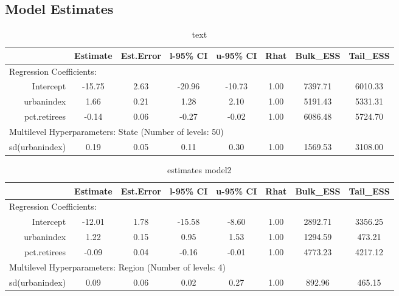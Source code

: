 \documentclass[12pt]{article}
\begin{document}
\FloatBarrier


\subsection*{Model Estimates}

\begin{table}[ht]
	\centering
	 \begin{adjustbox}{max width=\textwidth}
	\begin{tabular}{rccccccc}
		\hline
		& Estimate & Est.Error & l-95\% CI & u-95\% CI & Rhat & Bulk\_ESS & Tail\_ESS \\ 
		\hline
		\multicolumn{8}{l}{Regression Coefficients:} \\
		Intercept & -15.75 & 2.63 & -20.96 & -10.73 & 1.00 & 7397.71 & 6010.33 \\ 
		urbanindex & 1.66 & 0.21 & 1.28 & 2.10 & 1.00 & 5191.43 & 5331.31 \\ 
		pct.retirees & -0.14 & 0.06 & -0.27 & -0.02 & 1.00 & 6086.48 & 5724.70 \\
		\midrule
		\multicolumn{8}{l}{Multilevel Hyperparameters: State (Number of levels: 50)}                       \\ 
		sd(urbanindex) & 0.19 & 0.05 & 0.11 & 0.30 & 1.00 & 1569.53 & 3108.00 \\ 
		\hline
	\end{tabular}
		\end{adjustbox}
	\caption{text}
	\label{tab:model1}
\end{table}


\begin{table}[ht]
	\centering
		 \begin{adjustbox}{max width=\textwidth}
	\begin{tabular}{rccccccc}
		\hline
		               & Estimate & Est.Error & l-95\% CI & u-95\% CI & Rhat & Bulk\_ESS & Tail\_ESS \\
		               \hline
 \multicolumn{8}{l}{Regression Coefficients:} \\
		     Intercept &   -12.01 &      1.78 &    -15.58 &     -8.60 & 1.00 &   2892.71 &   3356.25 \\
		    urbanindex &     1.22 &      0.15 &      0.95 &      1.53 & 1.00 &   1294.59 &    473.21 \\
		  pct.retirees &    -0.09 &      0.04 &     -0.16 &     -0.01 & 1.00 &   4773.23 &   4217.12 \\
		  \midrule
		  \multicolumn{8}{l}{Multilevel Hyperparameters: Region (Number of levels: 4)}                       \\
		sd(urbanindex) &     0.09 &      0.06 &      0.02 &      0.27 & 1.00 &    892.96 &    465.15 \\ \hline
	\end{tabular}
	\end{adjustbox}
	\caption{estimates model2}
	\label{tab:model2}
\end{table}
\end{document}
